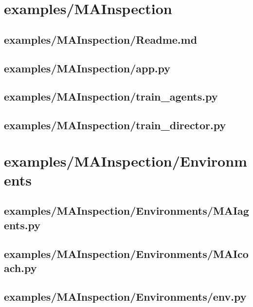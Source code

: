 \documentclass{article}
\begin{document}
\section{examples/MAInspection}
\subsection[Readme.md]{examples/MAInspection/Readme.md}

\newpage

\subsection[app.py]{examples/MAInspection/app.py}

\newpage

\subsection[train\_agents.py]{examples/MAInspection/train\_agents.py}

\newpage

\subsection[train\_director.py]{examples/MAInspection/train\_director.py}

\newpage

\section{examples/MAInspection/Environments}
\subsection[MAIagents.py]{examples/MAInspection/Environments/MAIagents.py}

\newpage

\subsection[MAIcoach.py]{examples/MAInspection/Environments/MAIcoach.py}

\newpage

\subsection[env.py]{examples/MAInspection/Environments/env.py}

\newpage
\end{document}

